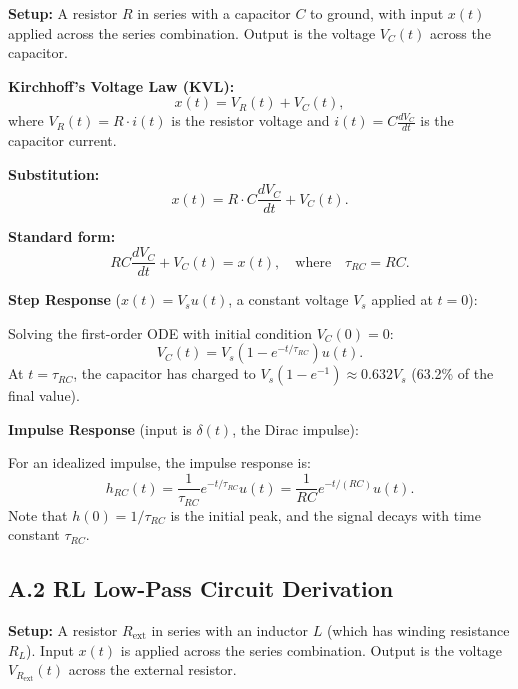 \documentclass[11pt,letterpaper]{article}
\begin{document}
\textbf{Setup:} A resistor $R$ in series with a capacitor $C$ to ground, with input $x(t)$ applied across the series combination. Output is the voltage $V_C(t)$ across the capacitor.

\textbf{Kirchhoff's Voltage Law (KVL):}
\begin{equation}
x(t) = V_R(t) + V_C(t),
\end{equation}
where $V_R(t) = R \cdot i(t)$ is the resistor voltage and $i(t) = C \frac{dV_C}{dt}$ is the capacitor current.

\noindent
\textbf{Substitution:}
\begin{equation}
x(t) = R \cdot C \frac{dV_C}{dt} + V_C(t).
\end{equation}

\noindent
\textbf{Standard form:}
\begin{equation}
RC \frac{dV_C}{dt} + V_C(t) = x(t), \quad \text{where} \quad \tau_{RC} = RC.
\end{equation}

\noindent
\textbf{Step Response} ($x(t) = V_s u(t)$, a constant voltage $V_s$ applied at $t=0$):

Solving the first-order ODE with initial condition $V_C(0) = 0$:
\begin{equation}
V_C(t) = V_s \left(1 - e^{-t/\tau_{RC}}\right) u(t).
\end{equation}
At $t = \tau_{RC}$, the capacitor has charged to $V_s(1 - e^{-1}) \approx 0.632 V_s$ (63.2\% of the final value).

\noindent
\textbf{Impulse Response} (input is $\delta(t)$, the Dirac impulse):

For an idealized impulse, the impulse response is:
\begin{equation}
h_{RC}(t) = \frac{1}{\tau_{RC}} e^{-t/\tau_{RC}} u(t) = \frac{1}{RC} e^{-t/(RC)} u(t).
\end{equation}
Note that $h(0) = 1/\tau_{RC}$ is the initial peak, and the signal decays with time constant $\tau_{RC}$.

\subsection*{A.2 RL Low-Pass Circuit Derivation}

\textbf{Setup:} A resistor $R_{\text{ext}}$ in series with an inductor $L$ (which has winding resistance $R_L$). Input $x(t)$ is applied across the series combination. Output is the voltage $V_{R_{\text{ext}}}(t)$ across the external resistor.
\end{document}
